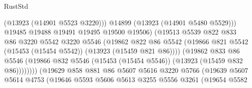 \begin{lexlean}{RustStd}
\begin{coremodule}
                                          (@13923 (@14901 @5523 @3220)))
                                        @14899
                                        (@13923 (@14901 @5480 @5529)))
                                      @19485
                                      @19488
                                      @19491
                                      @19495
                                      @19500
                                      @19506)
                                    (@19513
                                      @5539
                                      @822
                                      @833
                                      @86
                                      @3220
                                      @5542
                                      @3220
                                      @5546
                                      (@19862
                                        @822
                                        @86
                                        @5542
                                        (@19866
                                          @821
                                          @5542
                                          (@15453 (@15454 @5542))
                                          (@13923 (@15459 @821 @86))))
                                      (@19862
                                        @833
                                        @86
                                        @5546
                                        (@19866
                                          @832
                                          @5546
                                          (@15453 (@15454 @5546))
                                          (@13923 (@15459 @832 @86))))))))
                              (@19629
                                @858
                                @881
                                @86
                                @5607
                                @5616
                                @3220
                                @5766
                                (@19639
                                  @5607
                                  @5614
                                  @4753
                                  (@19646
                                    @5593
                                    @5606
                                    @5613
                                    @3255
                                    @5556
                                    @3261
                                    (@19654
                                      @5582

\end{coremodule}
\end{lexlean}

